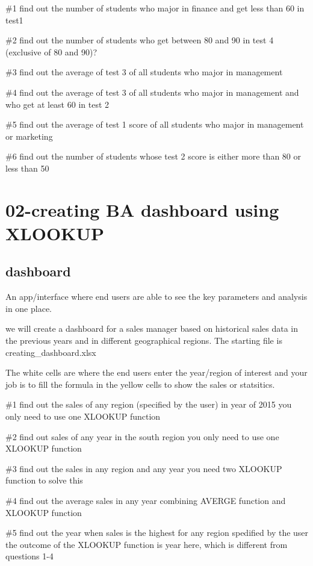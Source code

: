 \documentclass[
  letterpaper,
]{scrbook}
\begin{document}
\#1 find out the number of students who major in finance and get less
than 60 in test1

\#2 find out the number of students who get between 80 and 90 in test 4
(exclusive of 80 and 90)?

\#3 find out the average of test 3 of all students who major in
management

\#4 find out the average of test 3 of all students who major in
management and who get at least 60 in test 2

\#5 find out the average of test 1 score of all students who major in
management or marketing

\#6 find out the number of students whose test 2 score is either more
than 80 or less than 50


\chapter{02-creating BA dashboard using
XLOOKUP}\label{creating-ba-dashboard-using-xlookup}

\section{dashboard}\label{dashboard}

An app/interface where end users are able to see the key parameters and
analysis in one place.

we will create a dashboard for a sales manager based on historical sales
data in the previous years and in different geographical regions. The
starting file is creating\_dashboard.xlsx

The white cells are where the end users enter the year/region of
interest and your job is to fill the formula in the yellow cells to show
the sales or statsitics.

\#1 find out the sales of any region (specified by the user) in year of
2015 you only need to use one XLOOKUP function

\#2 find out sales of any year in the south region you only need to use
one XLOOKUP function

\#3 find out the sales in any region and any year you need two XLOOKUP
function to solve this

\#4 find out the average sales in any year combining AVERGE function and
XLOOKUP function

\#5 find out the year when sales is the highest for any region spedified
by the user the outcome of the XLOOKUP function is year here, which is
different from questions 1-4
\end{document}
